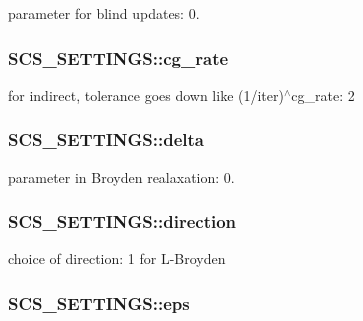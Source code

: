 parameter for blind updates\-: 0. \hypertarget{struct_s_c_s___s_e_t_t_i_n_g_s_a4549b5528b3b3ed290427b36e737ea13}{
\subsubsection[{cg\-\_\-rate}]{ S\-C\-S\-\_\-\-S\-E\-T\-T\-I\-N\-G\-S\-::cg\-\_\-rate}}\label{struct_s_c_s___s_e_t_t_i_n_g_s_a4549b5528b3b3ed290427b36e737ea13}
for indirect, tolerance goes down like (1/iter)$^\wedge$cg\-\_\-rate\-: 2 \hypertarget{struct_s_c_s___s_e_t_t_i_n_g_s_a3ced552856a3883d7c2d817b4e50d4ad}{
\subsubsection[{delta}]{ S\-C\-S\-\_\-\-S\-E\-T\-T\-I\-N\-G\-S\-::delta}}\label{struct_s_c_s___s_e_t_t_i_n_g_s_a3ced552856a3883d7c2d817b4e50d4ad}
parameter in Broyden realaxation\-: 0. \hypertarget{struct_s_c_s___s_e_t_t_i_n_g_s_ac784681a43d35217fcb58bf58a4b5c56}{
\subsubsection[{direction}]{ S\-C\-S\-\_\-\-S\-E\-T\-T\-I\-N\-G\-S\-::direction}}\label{struct_s_c_s___s_e_t_t_i_n_g_s_ac784681a43d35217fcb58bf58a4b5c56}
choice of direction\-: 1 for L-\/\-Broyden \hypertarget{struct_s_c_s___s_e_t_t_i_n_g_s_af831b18f2e8eea852b3eec22b7413c49}{
\subsubsection[{eps}]{ S\-C\-S\-\_\-\-S\-E\-T\-T\-I\-N\-G\-S\-::eps}}\label{struct_s_c_s___s_e_t_t_i_n_g_s_af831b18f2e8eea852b3eec22b7413c49}
